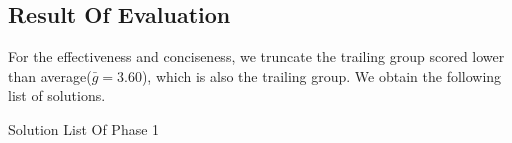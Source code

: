 \subsection{Result Of Evaluation}
For the effectiveness and conciseness, we truncate the trailing group scored lower than average($\bar{g}=3.60$), which is also the trailing group. We obtain the following list of solutions.

\begin{table}[ht]
\caption{Solution List Of Phase 1}
\label{tab:solution}
\end{table}


